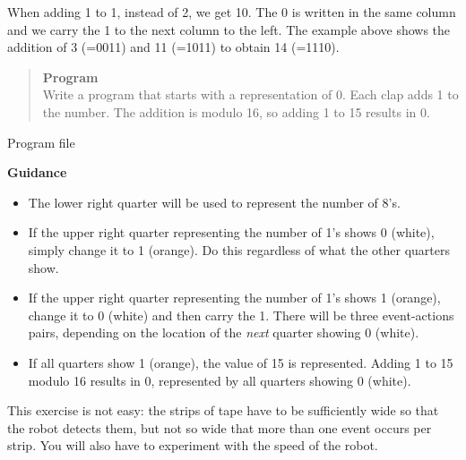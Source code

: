 When adding 1 to 1, instead of 2, we get 10. The 0 is written in the
same column and we carry the 1 to the next column to the left. The
example above shows the addition of 3 (=0011) and 11 (=1011) to obtain
14 (=1110).

\begin{quote}
\textbf{Program}\\
Write a program that starts with a representation of 0.
Each clap adds 1 to the number.
The addition is modulo 16, so adding 1 to 15 results in 0.
\end{quote}

{\raggedleft \hfill Program file }

\textbf{Guidance}

\begin{itemize}
\item The lower right quarter will be used to represent the number of 8's.
\item If the upper right quarter representing the number
of 1's shows 0 (white),
simply change it to 1 (orange). Do this regardless of what the other
quarters show.
\item If the upper right quarter representing the number of 1's
shows 1 (orange),
change it to 0 (white) and then carry the 1.
There will be three event-actions pairs,
depending on the location of the \emph{next} quarter showing 0
(white).
\item If all quarters show 1 (orange), the value of 15 is represented.
Adding 1 to 15 modulo 16 results in 0, represented by all quarters
showing 0 (white).
\end{itemize}

\bigskip


\bigskip


\bigskip

This exercise is not easy: the strips of tape have to be
sufficiently wide so that the robot detects them,
but not so wide that more than one event occurs per strip.
You will also have to experiment with the speed of the robot.

